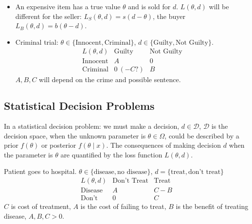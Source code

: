 \documentclass[10pt, a4paper]{article}
\begin{document}
\begin{example}
    \begin{itemize}
        \item  An expensive item has a true value $\theta$ and is sold for $d$.
        $L(\theta, d)$ will be different for the seller:
        $L_S(\theta, d) = s(d - \theta)$,
        the buyer $L_B(\theta, d) = b(\theta - d)$.

        \item Criminal trial:
        $\theta \in \{\text{Innocent}, \text{Criminal}\}$,
        $d \in \{\text{Guilty}, \text{Not Guilty}\}$.
        \[
        \begin{array}{c|cc}
             L(\theta, d) & \text{Guilty} & \text{Not Guilty} \\
             \hline
             \text{Innocent} & A & 0 \\
             \text{Criminal} & 0\ (-C?) & B
        \end{array}
        \]
        $A, B, C$ will depend on the crime and possible sentence.
    \end{itemize}
\end{example}

\subsection{Statistical Decision Problems}
In a statistical decision problem:
we must make a decision,
$d \in \mathcal{D}$,
$\mathcal{D}$ is the decision space,
when the unknown parameter is $\theta \in \Omega$,
could be described by a prior $f(\theta)$ or posterior $f(\theta \mid x)$.
The consequences of making decision $d$ when the parameter is $\theta$ are quantified by the loss function $L(\theta, d)$.

\begin{example}
    Patient goes to hospital.
    $\theta \in \{\text{disease}, \text{no disease}\}$,
    $d = \{\text{treat}, \text{don't treat}\}$
    \[
    \begin{array}{c|cc}
         L(\theta, d) & \text{Don't Treat} & \text{Treat}  \\
         \hline
         \text{Disease} & A & C - B \\
         \text{Don't} & 0 & C 
    \end{array}
    \]
    $C$ is cost of treatment,
    $A$ is the cost of failing to treat,
    $B$ is the benefit of treating disease,
    $A, B, C > 0$.
\end{example}
\end{document}
